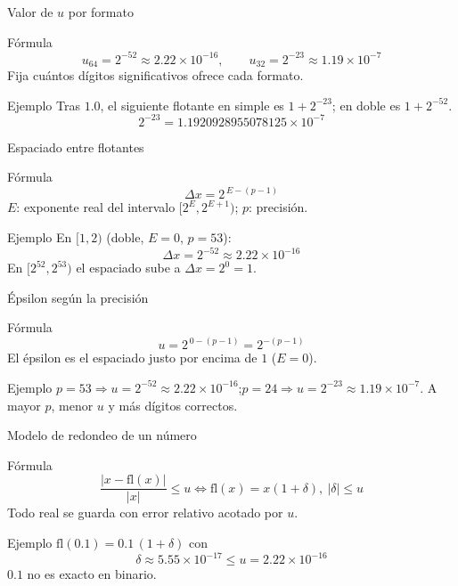 \documentclass[aspectratio=169,10pt]{beamer}
\begin{document}
\begin{frame}{Valor de $u$ por formato}
\begin{cardidea}{Fórmula}{\faSuperscript}
\[ u_{64}=2^{-52}\approx 2.22\times10^{-16},\qquad u_{32}=2^{-23}\approx 1.19\times10^{-7} \]
Fija cuántos dígitos significativos ofrece cada formato.
\end{cardidea}
\vspace{1.5mm}
\begin{cardgear}{Ejemplo}{\faCalculator}
Tras $1.0$, el siguiente flotante en simple es $1+2^{-23}$; en doble es $1+2^{-52}$.
\[ 2^{-23}=1.1920928955078125\times10^{-7} \]
\end{cardgear}
\end{frame}

\begin{frame}{Espaciado entre flotantes}
\begin{cardidea}{Fórmula}{\faSuperscript}
\[ \Delta x = 2^{\,E-(p-1)} \]
$E$: exponente real del intervalo $[2^E,2^{E+1})$; $p$: precisión.
\end{cardidea}
\vspace{1.5mm}
\begin{cardgear}{Ejemplo}{\faCalculator}
En $[1,2)$ (doble, $E=0$, $p=53$):
\[ \Delta x = 2^{-52}\approx 2.22\times10^{-16} \]
En $[2^{52},2^{53})$ el espaciado sube a $\Delta x = 2^{0}=1$.
\end{cardgear}
\end{frame}

\begin{frame}{Épsilon según la precisión}
\begin{cardidea}{Fórmula}{\faSuperscript}
\[ u = 2^{\,0-(p-1)} = 2^{-(p-1)} \]
El épsilon es el espaciado justo por encima de $1$ ($E=0$).
\end{cardidea}
\vspace{1.5mm}
\begin{cardgear}{Ejemplo}{\faCalculator}
$p=53\Rightarrow u=2^{-52}\approx 2.22\times10^{-16}$;\quad $p=24\Rightarrow u=2^{-23}\approx 1.19\times10^{-7}$.
A mayor $p$, menor $u$ y más dígitos correctos.
\end{cardgear}
\end{frame}

\begin{frame}{Modelo de redondeo de un número}
\begin{cardidea}{Fórmula}{\faSuperscript}
\[ \frac{|x-\mathrm{fl}(x)|}{|x|}\le u \iff \mathrm{fl}(x)=x(1+\delta),\ |\delta|\le u \]
Todo real se guarda con error relativo acotado por $u$.
\end{cardidea}
\vspace{1.5mm}
\begin{cardgear}{Ejemplo}{\faCalculator}
$\mathrm{fl}(0.1)=0.1\,(1+\delta)$ con
\[ \delta\approx 5.55\times10^{-17}\le u=2.22\times10^{-16} \]
$0.1$ no es exacto en binario.
\end{cardgear}
\end{frame}
\end{document}
